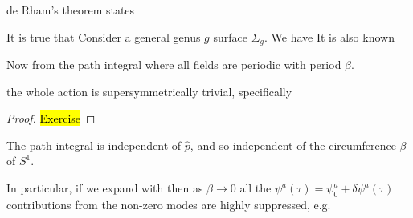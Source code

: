 \documentclass{article}
\begin{document}
\begin{theorem}
de Rham's theorem states 
\end{theorem}

\begin{example}
It is true that   
Consider a general genus $g$ surface $\Sigma_g$. We have 
It is also known 
\end{example}
Now from the path integral 
where all fields are periodic with period $\beta$. 
\begin{prop}
the whole action is supersymmetrically trivial, specifically  
\end{prop}
\begin{proof}
	\hl{Exercise}
\end{proof}
\begin{corollary}
The path integral is independent of $\hat{p}$, and so independent of  the circumference $\beta$ of $S^1$. 
\end{corollary}
In particular, if we expand 
with 
then as $\beta \to 0$ all the $\psi^a(\tau) = \psi_0^a + \delta \psi^a(\tau)$ contributions from the non-zero modes are highly suppressed, e.g. 
\end{document}
